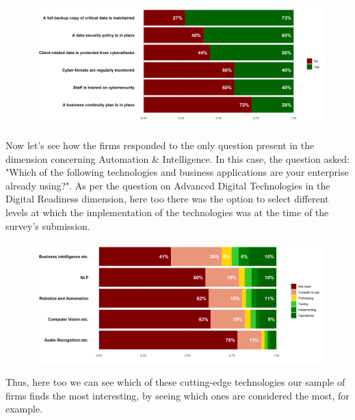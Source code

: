 \documentclass[12pt]{report}
\begin{document}
\begin{figure}[h!]
    \centering
    \includegraphics[width=\linewidth]{../Output/q8.png}
    \caption{}
    \label{fig:q8_table}
\end{figure}

\par Now let's see how the firms responded to the only question present in the dimension concerning Automation \& Intelligence. In this case, the question asked: "Which of the following technologies and business applications are your enterprise already using?". As per the question on Advanced Digital Technologies in the Digital Readiness dimension, here too there was the option to select different levels at which the implementation of the technologies was at the time of the survey's submission.




\begin{figure}[h!]
    \centering
    \includegraphics[width=\linewidth]{../Output/q9.png}
    \caption{}
    \label{fig:q9_table}
\end{figure}


\par Thus, here too we can see which of these cutting-edge technologies our sample of firms finds the most interesting, by seeing which ones are considered the most, for example.
\end{document}
